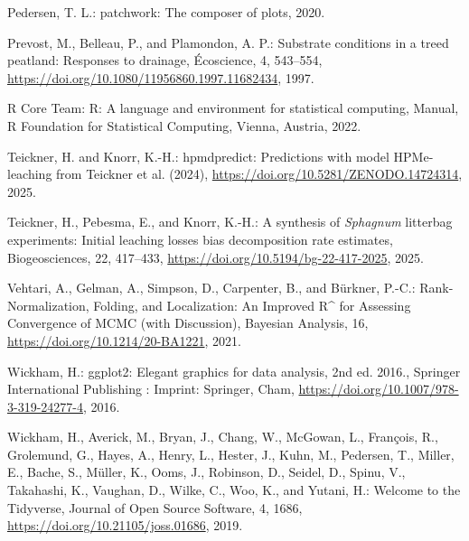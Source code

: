 \documentclass[
  12pt,
]{article}
\newlength{\cslhangindent}
\newlength{\cslentryspacingunit} %
\newenvironment{CSLReferences}[2] %
 {%
  \setlength{\parindent}{0pt}
  \ifodd #1
  \let\oldpar\par
  \def\par{\hangindent=\cslhangindent\oldpar}
  \fi
  \setlength{\parskip}{#2\cslentryspacingunit}
 }%
 {}
\begin{document}
\begin{CSLReferences}{0}{0}
\leavevmode{}%
Pedersen, T. L.: {patchwork}: {The} composer of plots, 2020.

\leavevmode{}%
Prevost, M., Belleau, P., and Plamondon, A. P.: Substrate conditions in a treed peatland: {Responses} to drainage, {É}coscience, 4, 543--554, \url{https://doi.org/10.1080/11956860.1997.11682434}, 1997.

\leavevmode{}%
R Core Team: R: {A} language and environment for statistical computing, Manual, R Foundation for Statistical Computing, Vienna, Austria, 2022.

\leavevmode{}%
Teickner, H. and Knorr, K.-H.: {hpmdpredict}: {Predictions} with model {HPMe-leaching} from {Teickner} et al. (2024), \url{https://doi.org/10.5281/ZENODO.14724314}, 2025.

\leavevmode{}%
Teickner, H., Pebesma, E., and Knorr, K.-H.: A synthesis of {\emph{Sphagnum}} litterbag experiments: Initial leaching losses bias decomposition rate estimates, Biogeosciences, 22, 417--433, \url{https://doi.org/10.5194/bg-22-417-2025}, 2025.

\leavevmode{}%
Vehtari, A., Gelman, A., Simpson, D., Carpenter, B., and Bürkner, P.-C.: Rank-{Normalization}, {Folding}, and {Localization}: {An Improved R{\^{}}} for {Assessing Convergence} of {MCMC} (with {Discussion}), Bayesian Analysis, 16, \url{https://doi.org/10.1214/20-BA1221}, 2021.

\leavevmode{}%
Wickham, H.: {ggplot2}: {Elegant} graphics for data analysis, 2nd ed. 2016., Springer International Publishing : Imprint: Springer, Cham, \url{https://doi.org/10.1007/978-3-319-24277-4}, 2016.

\leavevmode{}%
Wickham, H., Averick, M., Bryan, J., Chang, W., McGowan, L., François, R., Grolemund, G., Hayes, A., Henry, L., Hester, J., Kuhn, M., Pedersen, T., Miller, E., Bache, S., Müller, K., Ooms, J., Robinson, D., Seidel, D., Spinu, V., Takahashi, K., Vaughan, D., Wilke, C., Woo, K., and Yutani, H.: Welcome to the {Tidyverse}, Journal of Open Source Software, 4, 1686, \url{https://doi.org/10.21105/joss.01686}, 2019.

\end{CSLReferences}
\end{document}
